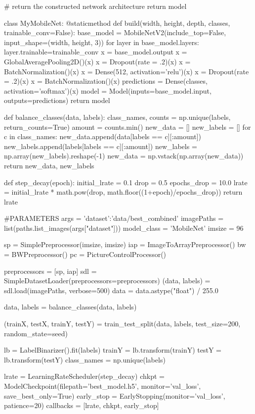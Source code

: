 \begin{python}
        # return the constructed network architecture
        return model

class MyMobileNet:
    @staticmethod
    def build(width, height, depth, classes, trainable_conv=False):
        base_model = MobileNetV2(include_top=False, input_shape=(width, height, 3))
        for layer in base_model.layers:
            layer.trainable=trainable_conv
        x = base_model.output
        x = GlobalAveragePooling2D()(x)
        x = Dropout(rate = .2)(x)
        x = BatchNormalization()(x)
        x = Dense(512, activation='relu')(x)
        x = Dropout(rate = .2)(x)
        x = BatchNormalization()(x)
        predictions = Dense(classes, activation='softmax')(x)
        model = Model(inputs=base_model.input, outputs=predictions)
        return model

def balance_classes(data, labels):
    class_names, counts = np.unique(labels, return_counts=True)
    amount = counts.min()
    new_data = []
    new_labels = []
    for c in class_names:
        new_data.append(data[labels == c][:amount])
        new_labels.append(labels[labels == c][:amount])
    new_labels = np.array(new_labels).reshape(-1)
    new_data = np.vstack(np.array(new_data))
    return new_data, new_labels

def step_decay(epoch):
    initial_lrate = 0.1
    drop = 0.5
    epochs_drop = 10.0
    lrate = initial_lrate * math.pow(drop, math.floor((1+epoch)/epochs_drop))
    return lrate

#PARAMETERS
args = {'dataset':'data/best_combined'}
imagePaths = list(paths.list_images(args["dataset"]))
model_class = 'MobileNet'
imsize = 96


sp = SimplePreprocessor(imsize, imsize)
iap = ImageToArrayPreprocessor()
bw = BWPreprocessor()
pc = PictureControlProcessor()

preprocessors = [sp, iap]
sdl = SimpleDatasetLoader(preprocessors=preprocessors)
(data, labels) = sdl.load(imagePaths, verbose=500)
data = data.astype("float") / 255.0

data, labels = balance_classes(data, labels)

(trainX, testX, trainY, testY) = train_test_split(data, labels, test_size=200, random_state=seed)

lb = LabelBinarizer().fit(labels)
trainY = lb.transform(trainY)
testY = lb.transform(testY)
class_names = np.unique(labels)

lrate = LearningRateScheduler(step_decay)
chkpt = ModelCheckpoint(filepath='best_model.h5', monitor='val_loss', save_best_only=True)
early_stop = EarlyStopping(monitor='val_loss', patience=20)
callbacks = [lrate,
            chkpt,
            early_stop]
            

\end{python}
